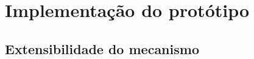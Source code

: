 
\chapter{Implementação do protótipo}

\label{cap:implementacao}

\section{Extensibilidade do mecanismo}
\label{sec:extensibilidade}
